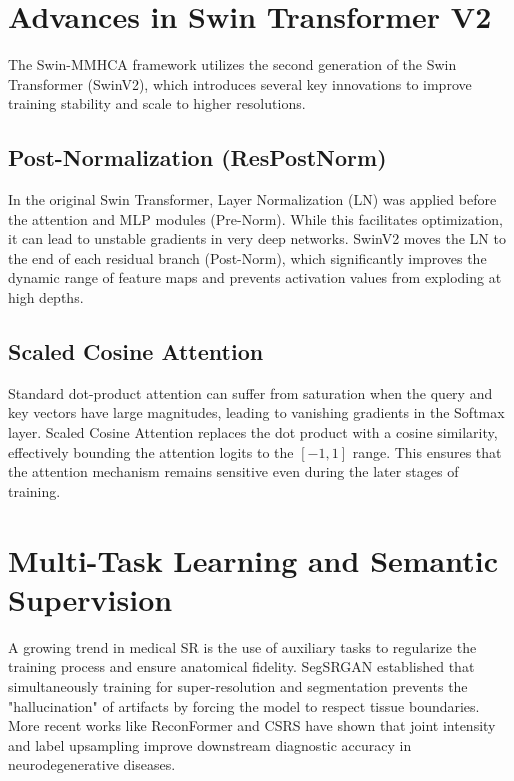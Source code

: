 \section{Advances in Swin Transformer V2}
The Swin-MMHCA framework utilizes the second generation of the Swin Transformer (SwinV2), which introduces several key innovations to improve training stability and scale to higher resolutions.

\subsection{Post-Normalization (ResPostNorm)}
In the original Swin Transformer, Layer Normalization (LN) was applied before the attention and MLP modules (Pre-Norm). While this facilitates optimization, it can lead to unstable gradients in very deep networks. SwinV2 moves the LN to the end of each residual branch (Post-Norm), which significantly improves the dynamic range of feature maps and prevents activation values from exploding at high depths.

\subsection{Scaled Cosine Attention}
Standard dot-product attention can suffer from saturation when the query and key vectors have large magnitudes, leading to vanishing gradients in the Softmax layer. Scaled Cosine Attention replaces the dot product with a cosine similarity, effectively bounding the attention logits to the $[-1, 1]$ range. This ensures that the attention mechanism remains sensitive even during the later stages of training.

\section{Multi-Task Learning and Semantic Supervision}
A growing trend in medical SR is the use of auxiliary tasks to regularize the training process and ensure anatomical fidelity. SegSRGAN established that simultaneously training for super-resolution and segmentation prevents the "hallucination" of artifacts by forcing the model to respect tissue boundaries. More recent works like ReconFormer and CSRS have shown that joint intensity and label upsampling improve downstream diagnostic accuracy in neurodegenerative diseases.

